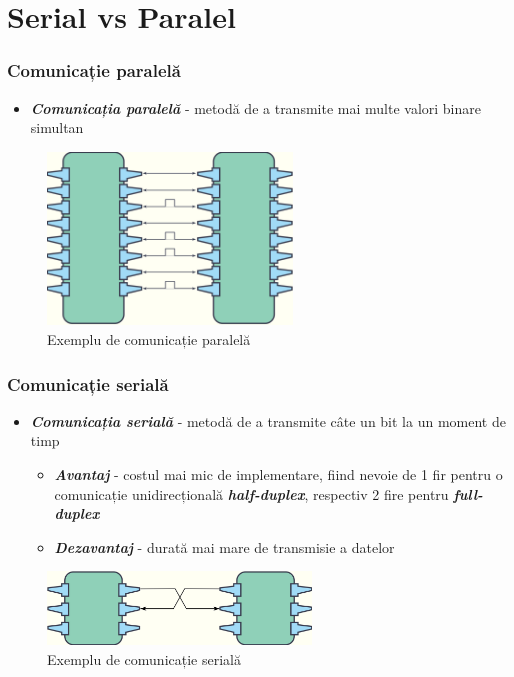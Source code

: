 \documentclass[xcolor={table}]{beamer}
\begin{document}
	\section{Serial vs Paralel}
	\begin{frame}
	    \frametitle{Comunicație paralelă}
	    \begin{itemize}
	        \item \textbf{\textit{Comunicația paralelă}} - metodă de a transmite mai multe valori binare simultan
	    \end{itemize}
	    \begin{figure}
	        \centering
	        \includegraphics[width=6.5cm]{images/paralel1.png}
	        \caption{Exemplu de comunicație paralelă}
	        \label{fig:my_label}
	    \end{figure}
	\end{frame}
	\begin{frame}
	    \frametitle{Comunicație serială}
	    \begin{itemize}
	        \item \textbf{\textit{Comunicația serială}} - metodă de a transmite câte un bit la un moment de timp
	        \begin{itemize}
	            \item \textbf{\textit{Avantaj}} - costul mai mic de implementare, fiind nevoie de 1 fir pentru o comunicație unidirecțională \textbf{\textit{half-duplex}}, respectiv 2 fire pentru \textbf{\textit{full-duplex}}
	            \item \textbf{\textit{Dezavantaj}} - durată mai mare de transmisie a datelor
	        \end{itemize}
	    \end{itemize}
	    \begin{figure}
	        \centering
	        \includegraphics[width=7cm]{images/serial1.png}
	        \caption{Exemplu de comunicație serială}
	        \label{fig:my_label}
	    \end{figure}
	\end{frame}
\end{document}
